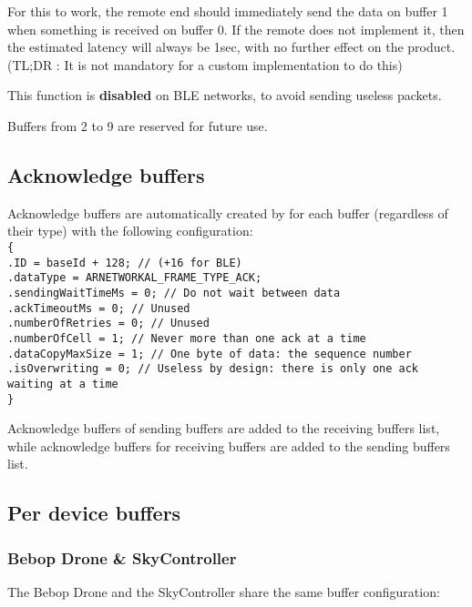 For this to work, the remote end should immediately send the data on buffer 1 when something is received on buffer 0. If the remote does not implement it, then the estimated latency will always be 1sec, with no further effect on the product. (TL;DR : It is not mandatory for a custom implementation to do this)

This function is \textbf{disabled} on BLE networks, to avoid sending useless packets.

Buffers from 2 to 9 are reserved for future use.

\subsection{Acknowledge buffers}

Acknowledge buffers are automatically created by  for each buffer (regardless of their type) with the following configuration:\\
\texttt{\{\\
    .ID = baseId + 128; // (+16 for BLE)\\
    .dataType = ARNETWORKAL\_FRAME\_TYPE\_ACK;\\
    .sendingWaitTimeMs = 0; // Do not wait between data\\
    .ackTimeoutMs = 0; // Unused\\
    .numberOfRetries = 0; // Unused\\
    .numberOfCell = 1; // Never more than one ack at a time\\
    .dataCopyMaxSize = 1; // One byte of data: the sequence number\\
    .isOverwriting = 0; // Useless by design: there is only one ack waiting at a time\\
\}}

Acknowledge buffers of sending buffers are added to the receiving buffers list, while acknowledge buffers for receiving buffers are added to the sending buffers list.

\subsection{Per device buffers}

\subsubsection{Bebop Drone \& SkyController}

The Bebop Drone and the SkyController share the same buffer configuration:

